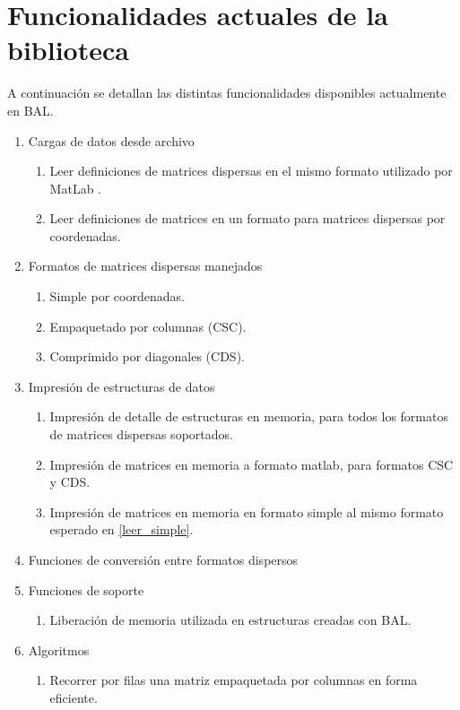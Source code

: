 \documentclass[a4paper,10pt]{article}
\begin{document}
\section{Funcionalidades actuales de la biblioteca}
\label{sec_funcionalidad}
A continuación se detallan las distintas funcionalidades disponibles actualmente en BAL.
\begin{enumerate}
 \item Cargas de datos desde archivo
 \begin{enumerate}
  \item Leer definiciones de matrices dispersas en el mismo formato utilizado por MatLab \cite{matlab}.
  \item \label{leer_simple} Leer definiciones de matrices en un formato para matrices dispersas por coordenadas. %
 \end{enumerate}
 \item Formatos de matrices dispersas manejados
 \begin{enumerate}
  \item Simple por coordenadas.
  \item Empaquetado por columnas (CSC).
  \item Comprimido por diagonales (CDS).
 \end{enumerate}
 \item Impresión de estructuras de datos
 \begin{enumerate}
  \item Impresión de detalle de estructuras en memoria, para todos los formatos de matrices dispersas soportados.
  \item Impresión de matrices en memoria a formato matlab, para formatos CSC y CDS.
  \item Impresión de matrices en memoria en formato simple al mismo formato esperado en \ref{leer_simple}.
 \end{enumerate}
 \item Funciones de conversión entre formatos dispersos
 \item Funciones de soporte
 \begin{enumerate}
  \item Liberación de memoria utilizada en estructuras creadas con BAL.
 \end{enumerate}
 \item Algoritmos
 \begin{enumerate}
  \item Recorrer por filas una matriz empaquetada por columnas en forma eficiente.

\end{enumerate}
\end{enumerate}
\end{document}
